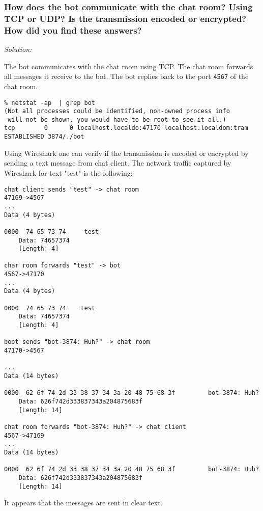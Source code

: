 \documentclass[a4paper,11pt]{article}
\newenvironment{solution}%
{\par{\noindent\small\textit{Solution:}}\vspace{-12pt}\begin{framed}}%
{\end{framed}\par}
\begin{document}
\subsubsection*{How does the bot communicate with the chat room? Using TCP or
UDP? Is the transmission encoded or encrypted? How did you find these answers?}
\ifsolution
\begin{solution}
The bot communicates with the chat room using TCP. The chat room forwards all messages it receive 
to the bot. The bot replies back to the port \texttt{4567} of the chat room.
\begin{lstlisting}
% netstat -ap  | grep bot   
(Not all processes could be identified, non-owned process info
 will not be shown, you would have to be root to see it all.)
tcp        0      0 localhost.localdo:47170 localhost.localdom:tram ESTABLISHED 3874/./bot          
\end{lstlisting}

Using Wireshark one can verify if the transmission is encoded or encrypted by sending a text 
message from chat client. The network traffic captured by Wireshark for  text "test" is the 
following:

\begin{lstlisting}
chat client sends "test" -> chat room 
47169->4567
...
Data (4 bytes)

0000  74 65 73 74     test
    Data: 74657374
    [Length: 4]

char room forwards "test" -> bot
4567->47170
...
Data (4 bytes)

0000  74 65 73 74    test
    Data: 74657374
    [Length: 4]

boot sends "bot-3874: Huh?" -> chat room 
47170->4567

...
Data (14 bytes)

0000  62 6f 74 2d 33 38 37 34 3a 20 48 75 68 3f         bot-3874: Huh?
    Data: 626f742d333837343a204875683f
    [Length: 14]

chat room forwards "bot-3874: Huh?" -> chat client
4567->47169
...
Data (14 bytes)

0000  62 6f 74 2d 33 38 37 34 3a 20 48 75 68 3f         bot-3874: Huh?
    Data: 626f742d333837343a204875683f
    [Length: 14]
\end{lstlisting} 

It appears that the messages are sent in clear text. 

\end{solution}\fi
\end{document}
